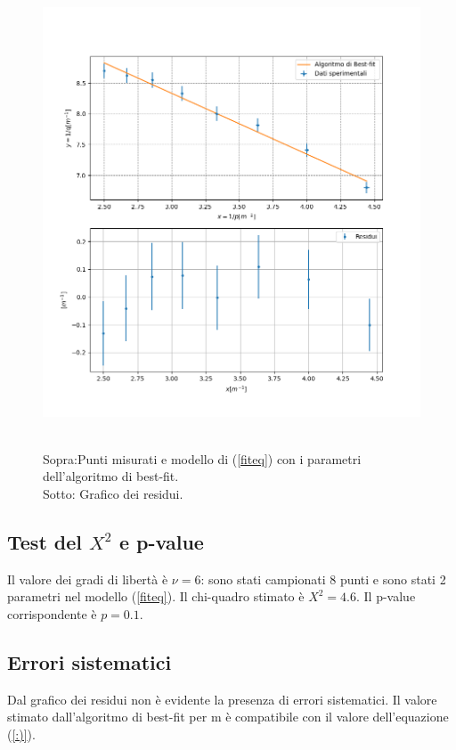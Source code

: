 \documentclass{article}
\begin{document}
\begin{figure}
	\includegraphics[width=\textwidth]{cylindricallens_grafico.png}
	\label{plottinobello}
	\caption{\\Sopra:Punti misurati e modello di (\ref{fiteq}) con i parametri dell'algoritmo di best-fit. \\ Sotto: Grafico dei residui.}
\end{figure}


\subsection{Test del $ X^2$ e p-value}
Il valore dei gradi di libertà è $\nu=6$: sono stati campionati 8 punti e sono stati 2 parametri nel modello (\ref{fiteq}). 
Il chi-quadro stimato è $X^2=4.6$.
Il p-value corrispondente è $p=0.1$.

\subsection{Errori sistematici}
Dal grafico dei residui non è evidente la presenza di errori sistematici.
Il valore stimato dall'algoritmo di best-fit per m  è compatibile con il valore dell'equazione (\ref{:)}).
\end{document}
